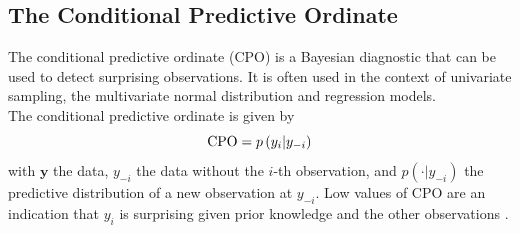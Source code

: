 \subsection{The Conditional Predictive Ordinate}
The conditional predictive ordinate (CPO) is a Bayesian diagnostic that can be used to detect surprising observations. It is often used in the context of univariate sampling, the multivariate normal distribution and regression models. \\
The conditional predictive ordinate is given by
\begin{equation}
    \hbox{CPO} = p\left(y_i|y_{-i}\right)
\end{equation}
with $\pmb{y}$ the data, $y_{-i}$ the data without the $i$-th observation, and $p\left(\cdot|y_{-i}\right)$ the predictive distribution of a new observation at $y_{-i}$. Low values of CPO are an indication that $y_i$ is surprising given prior knowledge and the other observations \autocite[][]{pettit1990conditional, cox1980discussion}.
